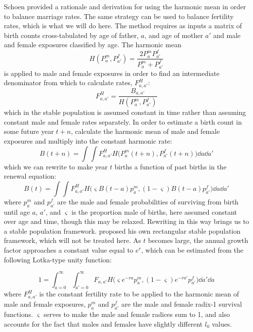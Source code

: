 \FloatBarrier
Schoen \citep{schoen1978standardized, schoen1977two, schoen1981harmonic}
provided a rationale and derivation for using the harmonic mean in order to
balance marriage rates. The same strategy can be used to balance fertility
rates, which is what we will do here. The method requires as inputs a matrix of
birth counts cross-tabulated by age of father, $a$, and age of mother $a'$ and
male and female exposures classified by age. The harmonic mean
\begin{equation}
H(P_a^m, P_{a'}^f) = \frac{2 P_a^m P_{a'}^f}{P_a^m + P_{a'}^f}
\end{equation}
is applied to male and female exposures in order to find an intermediate
denominator from which to calculate rates, $F_{a,a'}^H$:
 \FloatBarrier
 \begin{equation}
 F_{a,a'}^H = \frac{B_{a,a'}}{H(P_a^m, P_{a'}^f)}
 \end{equation}
which in the stable population is assumed constant in time rather than
assuming constant male and female rates separately. In order to estimate 
a birth count in some future year $t+n$, calculate the harmonic mean
of male and female exposures and multiply into the constant harmonic rate:
 \begin{equation}
 B(t+n) = \int \int F_{a,a'}^H H\Big(P_{a}^m(t+n), P_{a'}^f(t+n)\Big) \dd a \dd
 a'
 \end{equation}
which we can rewrite to make year $t$ births a function of past births in the
renewal equation:
 \begin{equation}
 B(t) = \int \int F_{a,a'}^H H\Big(\varsigma B(t-a)p_a^m, (1-\varsigma) B(t-a)
 p_{a'}^f\Big) \dd a
 \dd a'
 \end{equation}
where $p_a^m$ and $p_{a'}^f$ are the male and female probabilities of surviving
from birth until age $a$, $a'$, and $\varsigma$ is the proportion male of
births, here assumed constant over age and time, though this may be relaxed.
Rewriting in this way brings us to a stable population framework. \citet{schoen1977two} 
proposed his own rectangular stable population framework, which 
will not be treated here. As $t$ becomes large, the annual growth factor
approaches a constant value equal to $e^r$, which can be estimated from the
following Lotka-type unity function: 

\begin{equation}
\label{eq:lotkaH}
1 = \int _{a=0}^\infty \int _{a'=0}^\infty F_{a,a'} H\Big(\varsigma
e^{-ra}p_a^m, (1-\varsigma)e^{-ra'}p_{a'}^f\Big)\dd a' \dd a
\end{equation}
where $F_{a,a'}^H$ is the constant fertility rate to be applied to the harmonic
mean of male and female exposures, $p_a^m$ and $p_{a'}^f$ are the male
and female radix-1 survival functions. $\varsigma$ serves to make the
male and female radices sum to 1, and also accounts for the fact that males and
females have slightly different $l_0$ values. 

